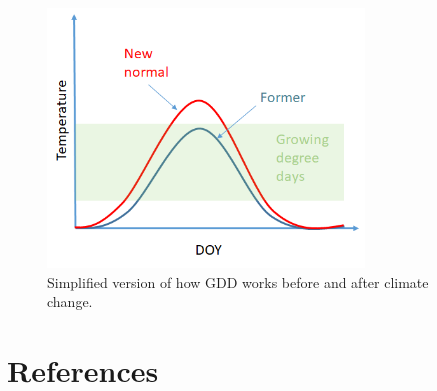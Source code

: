 \documentclass[11pt]{article}
\begin{document}
\begin{figure}[h!]
\includegraphics[width=0.75\textwidth]{..//figures/simpletempcurve_fromlucidboard.png}
\caption{Simplified version of how GDD works before and after climate change.}
\label{fig:simpletemp}
\end{figure}
\fi

\clearpage
\section{References}

\end{document}

